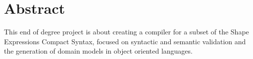 \chapter*{Abstract}

This end of degree project is about creating a compiler for a subset of the Shape Expressions Compact Syntax, focused on syntactic and semantic validation and the generation of domain models in object oriented languages. 
